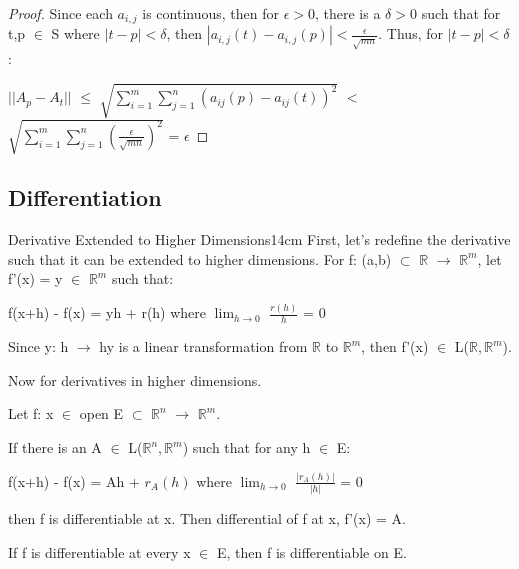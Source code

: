     \begin{proof}
        Since each $a_{i,j}$ is continuous, then for $\epsilon > 0$,
        there is a $\delta > 0$ such that for t,p $\in$ S where $|t-p| < \delta$,
        then $|a_{i,j}(t) - a_{i,j}(p)| < \frac{\epsilon}{\sqrt{mn}}$.
        Thus, for $|t-p| < \delta$:

        \hspace{0.5cm}
        $||A_p - A_t||$
        $\leq$ $\sqrt{\sum_{i=1}^m \sum_{j=1}^n (a_{ij}(p) - a_{ij}(t))^2}$
        $<$ $\sqrt{\sum_{i=1}^m \sum_{j=1}^n (\frac{\epsilon}{\sqrt{mn}})^2}$
        = $\epsilon$
    \end{proof}

    \vspace{0.5cm}





\subsection{ Differentiation }

    \begin{definition}{Derivative Extended to Higher Dimensions}{14cm}
        First, let's redefine the derivative such that it can be extended to
        higher dimensions.
        For f: (a,b) $\subset$ $\mathbb{R}$ $\rightarrow$ $\mathbb{R}^m$,
        let f'(x) = y $\in$ $\mathbb{R}^m$ such that:

        \hspace{0.5cm}
        f(x+h) - f(x) = yh + r(h)
        \hspace{1cm}
        where $\lim_{h \rightarrow 0}$ $\frac{r(h)}{h}$ = 0

        Since y: h $\rightarrow$ hy is a linear transformation
        from $\mathbb{R}$ to $\mathbb{R}^m$, then
        f'(x) $\in$ L($\mathbb{R},\mathbb{R}^m$).

        \vspace{0.3cm}

        Now for derivatives in higher dimensions.
        
        Let f: x $\in$ open E $\subset$ $\mathbb{R}^n$ $\rightarrow$ $\mathbb{R}^m$.
        
        If there is an A $\in$ L($\mathbb{R}^n,\mathbb{R}^m$) such that
        for any h $\in$ E:

        \hspace{0.5cm}
        f(x+h) - f(x) = Ah + $r_A(h)$
        \hspace{1cm}
        where $\lim_{h \rightarrow 0}$ $\frac{|r_A(h)|}{|h|}$ = 0

        then f is differentiable at x.
        Then differential of f at x, f'(x) = A.

        If f is differentiable at every x $\in$ E, then f is differentiable on E.
    \end{definition}

